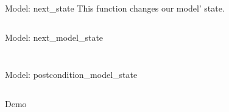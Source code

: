 \begin{frame}{Model: next\_state}
  This function changes our model' state.

  \inputminted{erlang}{./code/next_state.erl}
\end{frame}

\begin{frame}{Model: next\_model\_state}
  \inputminted{erlang}{./code/next_model_state.erl}
\end{frame}

\begin{frame}
  \inputminted{erlang}{./code/next_model_state1.erl}
\end{frame}



\begin{frame}{Model: postcondition\_model\_state}
  \inputminted{erlang}{./code/postcondition_model_state.erl}
\end{frame}

\begin{frame}[standout]
  Demo
\end{frame}